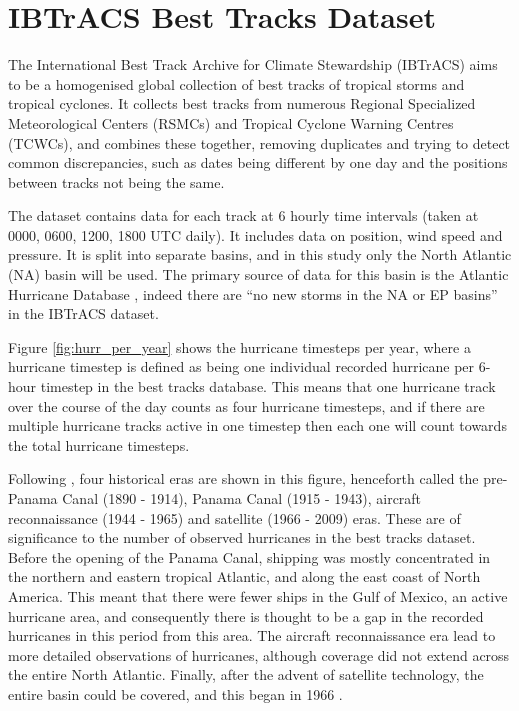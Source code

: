 \documentclass[pdftex,12pt,a4paper]{report}
\begin{document}
\section{IBTrACS Best Tracks Dataset}
\label{sec:ibtracs}
The International Best Track Archive for Climate Stewardship (IBTrACS)
\parencite{knappInternational2010} aims to be a homogenised global collection of best tracks of
tropical storms and tropical cyclones. It collects best tracks from numerous Regional Specialized
Meteorological Centers (RSMCs) and Tropical Cyclone Warning Centres (TCWCs), and combines these
together, removing duplicates and trying to detect common discrepancies, such as dates being different
by one day and the positions between tracks not being the same.

The dataset contains data for each track at 6 hourly time intervals (taken at 0000, 0600, 1200, 1800
UTC daily). It includes data on position, wind speed and pressure. It is split into separate basins,
and in this study only the North Atlantic (NA) basin will be used. The primary source of data
for this basin is the Atlantic Hurricane Database \parencite[HURDAT;][]{jarvinen1984tropical}, indeed
there are ``no new storms in the NA or EP basins'' in the IBTrACS dataset.

Figure \ref{fig:hurr_per_year} shows the hurricane timesteps per year, where a hurricane timestep is
defined as being one individual recorded hurricane per 6-hour timestep in the best tracks database.
This means that one hurricane track over the course of the day counts as four hurricane timesteps,
and if there are multiple hurricane tracks active in one timestep then each one will count towards
the total hurricane timesteps. 

Following \textcite{vecchi2008estimates}, four historical eras are shown in this figure, henceforth
called the pre-Panama Canal (1890 - 1914), Panama Canal (1915 - 1943), aircraft reconnaissance (1944
- 1965) and satellite (1966 - 2009) eras.  These are of significance to the number of observed
hurricanes in the best tracks dataset. Before the opening of the Panama Canal, shipping was
mostly concentrated in the northern and eastern tropical Atlantic, and along the east coast of North
America. This meant that there were fewer ships in the Gulf of Mexico, an active hurricane area, and
consequently there is thought to be a gap in the recorded hurricanes in this period from this area.
The aircraft reconnaissance era lead to more detailed observations of hurricanes, although coverage
did not extend across the entire North Atlantic. Finally, after the advent of satellite technology,
the entire basin could be covered, and this began in 1966 \parencite{landsea2007counting}.
\end{document}
